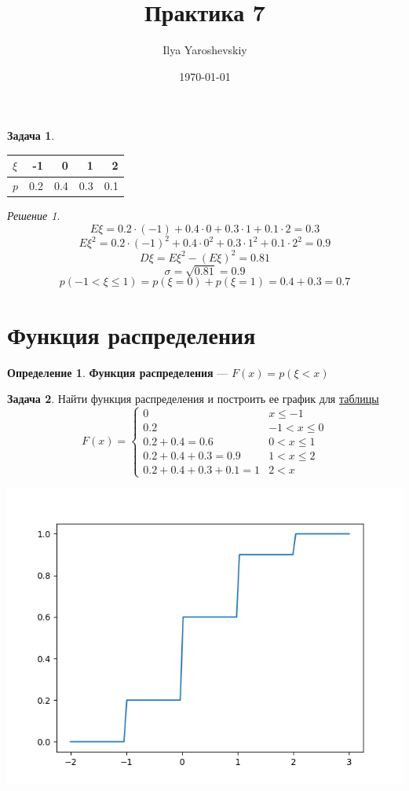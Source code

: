 \documentclass[english]{article}
\author{Ilya Yaroshevskiy}
\date{\today}
\title{Практика 7}
\theoremstyle{plain}
\theoremstyle{remark}
\newtheorem*{solution}{Решение}
\theoremstyle{definition}
\newtheorem{task}{Задача}
\newtheorem*{definition}{Определение}
\begin{document}
\maketitle
\tableofcontents

\begin{task}
\-
\begin{table}[htbp]
\label{tab:orge1c0678}
\centering
\begin{tabular}{l|rrrr}
\(\xi\) & -1 & 0 & 1 & 2\\
\hline
\(p\) & 0.2 & 0.4 & 0.3 & 0.1\\
\end{tabular}
\end{table}
\end{task}
\begin{solution}
\[ E\xi = 0.2\cdot (-1) + 0.4 \cdot 0 + 0.3 \cdot 1 + 0.1 \cdot 2 = 0.3 \]
\[ E\xi^2 = 0.2 \cdot (-1)^2 + 0.4 \cdot 0^2 + 0.3 \cdot 1^2 + 0.1 \cdot 2^2 = 0.9  \]
\[ D\xi = E\xi^2 - (E\xi)^2 = 0.81 \]
\[ \sigma = \sqrt{0.81} = 0.9 \]
\[ p(-1 < \xi \le 1) = p(\xi = 0) + p(\xi = 1) = 0.4 + 0.3 = 0.7 \]
\end{solution}
\section{Функция распределения}
\label{sec:orge670602}
\begin{definition}
\textbf{Функция распределения} --- \(F(x) = p(\xi < x)\)
\end{definition}
\begin{task}
Найти функция распределения и построить ее график для \hyperref[tab:orge1c0678]{таблицы}
\[ F(x) = \begin{cases}
0 &  x \le -1 \\
0.2 &  -1 < x \le 0 \\
0.2 + 0.4 = 0.6 &  0 < x \le 1 \\
0.2 + 0.4 + 0.3 = 0.9 &  1 < x \le 2 \\
0.2 + 0.4 + 0.3 + 0.1 = 1 & 2 < x
\end{cases} \]
\end{task}
\begin{center}
\includegraphics[scale=0.7]{graph_7_1.png}
\end{center}
\end{document}
